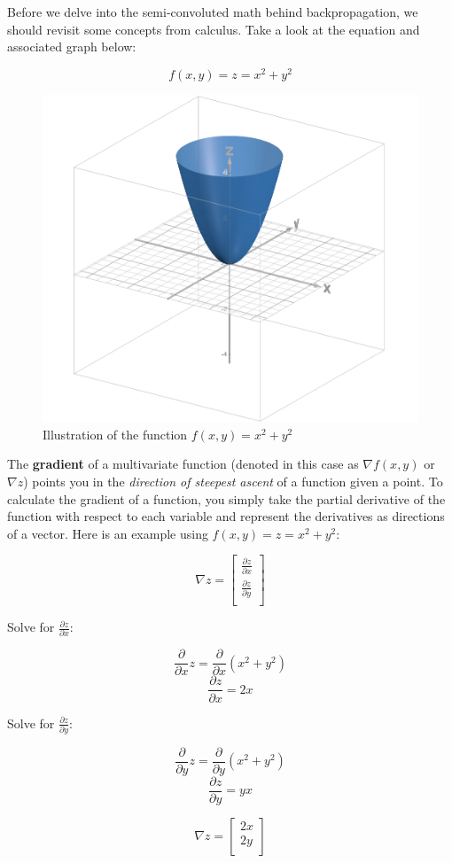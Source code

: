 \begin{flushleft}
    \large Before we delve into the semi-convoluted math behind backpropagation, we should revisit some concepts from calculus. Take a look at the equation and associated graph below:

    $$f(x, y) = z = x^2 + y^2$$

    \begin{figure}[H]
        \centering
        \includegraphics[width=0.5\linewidth]{dl/x2y2.png}
        \caption{Illustration of the function $f(x, y) = x^2 + y^2$}
        \label{fig:x2y2}
    \end{figure}

    The \textbf{gradient} of a multivariate function (denoted in this case as $\nabla f(x,y)$ or $\nabla z$) points you in the \textit{direction of steepest ascent} of a function given a point. To calculate the gradient of a function, you simply take the partial derivative of the function with respect to each variable and represent the derivatives as directions of a vector. Here is an example using $f(x,y) = z = x^2 + y^2$:

    $$\nabla z = \begin{bmatrix}
            \frac{\partial z}{\partial x}\\
            \frac{\partial z}{\partial y}\\
            \end{bmatrix}$$

    Solve for $\frac{\partial z}{\partial x}$:

    $$\frac{\partial}{\partial x}z = \frac{\partial}{\partial x}(x^2 + y^2)$$
    $$\frac{\partial z}{\partial x} = 2x$$

    Solve for $\frac{\partial z}{\partial y}$:
    
    $$\frac{\partial}{\partial y}z = \frac{\partial}{\partial y}(x^2 + y^2)$$
    $$\frac{\partial z}{\partial y} = yx$$

    $$\nabla z = \begin{bmatrix}
            2x\\
            2y\\
            \end{bmatrix}$$


\end{flushleft}
